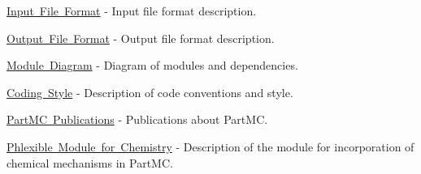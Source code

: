 \mbox{\hyperlink{input_format}{Input File Format}} -\/ Input file format description.

\mbox{\hyperlink{output_format}{Output File Format}} -\/ Output file format description.

\mbox{\hyperlink{module_diagram}{Module Diagram}} -\/ Diagram of modules and dependencies.

\mbox{\hyperlink{coding_style}{Coding Style}} -\/ Description of code conventions and style.

\mbox{\hyperlink{publications}{Part\+MC Publications}} -\/ Publications about Part\+MC.

\mbox{\hyperlink{phlex_chem}{Phlexible Module for Chemistry}} -\/ Description of the module for incorporation of chemical mechanisms in Part\+MC. 